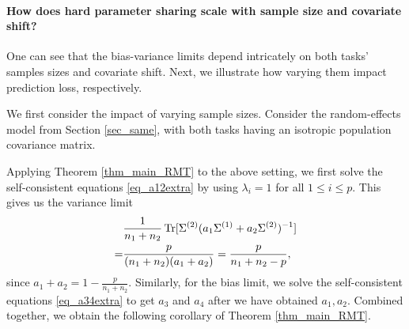 \paragraph{How does hard parameter sharing scale with sample size and covariate shift?}
One can see that the bias-variance limits depend intricately on both tasks' samples sizes and covariate shift.
Next, we illustrate how varying them impact prediction loss, respectively.
\begin{example}\label{ex_sample_ratio}
	We first consider the impact of varying sample sizes.
	Consider the random-effects model from Section \ref{sec_same}, with both tasks having an isotropic population covariance matrix.

	Applying Theorem \ref{thm_main_RMT} to the above setting, we first solve the self-consistent equations \eqref{eq_a12extra} by using $\lambda_i = 1$ for all $1\le i\le p$.
	This gives us the variance limit
	\begin{align*}
		&\frac{1}{n_1 + n_2} \operatorname{Tr}[\Sigma^{(2)} (a_1\Sigma^{(1)} + a_2\Sigma^{(2)})^{-1}]  \\
		=& \frac{p}{(n_1 + n_2)(a_1 + a_2)}
		= \frac{p}{n_1 + n_2 - p},
	\end{align*}
	since $a_1 + a_2 = 1 - \frac{p}{n_1 + n_2}$.
	Similarly, for the bias limit, we solve the self-consistent equations \eqref{eq_a34extra} to get $a_3$ and $a_4$ after we have obtained $a_1, a_2$.
	Combined together, we obtain the following corollary of Theorem \ref{thm_main_RMT}.
\end{example}

